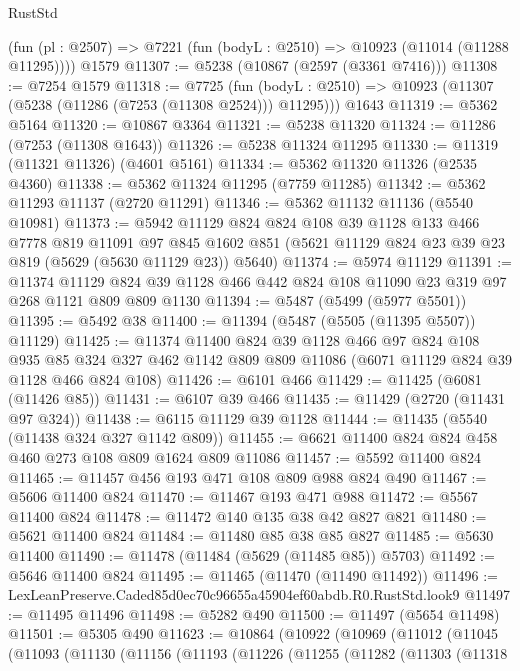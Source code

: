 \begin{lexlean}{RustStd}
\begin{coremodule}
    (fun (pl : @2507) => @7221 (fun (bodyL : @2510) => @10923 (@11014 (@11288 @11295))))
    @1579
@11307 := @5238 (@10867 (@2597 (@3361 @7416)))
@11308 := @7254 @1579
@11318 := @7725
    (fun (bodyL : @2510) => @10923 (@11307 (@5238 (@11286 (@7253 (@11308 @2524))) @11295)))
    @1643
@11319 := @5362 @5164
@11320 := @10867 @3364
@11321 := @5238 @11320
@11324 := @11286 (@7253 (@11308 @1643))
@11326 := @5238 @11324 @11295
@11330 := @11319 (@11321 @11326) (@4601 @5161)
@11334 := @5362 @11320 @11326 (@2535 @4360)
@11338 := @5362 @11324 @11295 (@7759 @11285)
@11342 := @5362 @11293 @11137 (@2720 @11291)
@11346 := @5362 @11132 @11136 (@5540 @10981)
@11373 := @5942
    @11129
    @824
    @824
    @108
    @39
    @1128
    @133
    @466
    @7778
    @819
    @11091
    @97
    @845
    @1602
    @851
    (@5621 @11129 @824 @23 @39 @23 @819 (@5629 (@5630 @11129 @23)) @5640)
@11374 := @5974 @11129
@11391 := @11374
    @11129
    @824
    @39
    @1128
    @466
    @442
    @824
    @108
    @11090
    @23
    @319
    @97
    @268
    @1121
    @809
    @809
    @1130
@11394 := @5487 (@5499 (@5977 @5501))
@11395 := @5492 @38
@11400 := @11394 (@5487 (@5505 (@11395 @5507)) @11129)
@11425 := @11374
    @11400
    @824
    @39
    @1128
    @466
    @97
    @824
    @108
    @935
    @85
    @324
    @327
    @462
    @1142
    @809
    @809
    @11086
    (@6071 @11129 @824 @39 @1128 @466 @824 @108)
@11426 := @6101 @466
@11429 := @11425 (@6081 (@11426 @85))
@11431 := @6107 @39 @466
@11435 := @11429 (@2720 (@11431 @97 @324))
@11438 := @6115 @11129 @39 @1128
@11444 := @11435 (@5540 (@11438 @324 @327 @1142 @809))
@11455 := @6621 @11400 @824 @824 @458 @460 @273 @108 @809 @1624 @809 @11086
@11457 := @5592 @11400 @824
@11465 := @11457 @456 @193 @471 @108 @809 @988 @824 @490
@11467 := @5606 @11400 @824
@11470 := @11467 @193 @471 @988
@11472 := @5567 @11400 @824
@11478 := @11472 @140 @135 @38 @42 @827 @821
@11480 := @5621 @11400 @824
@11484 := @11480 @85 @38 @85 @827
@11485 := @5630 @11400
@11490 := @11478 (@11484 (@5629 (@11485 @85)) @5703)
@11492 := @5646 @11400 @824
@11495 := @11465 (@11470 (@11490 @11492))
@11496 := LexLeanPreserve.Caded85d0ec70c96655a45904ef60abdb.R0.RustStd.look9
@11497 := @11495 @11496
@11498 := @5282 @490
@11500 := @11497 (@5654 @11498)
@11501 := @5305 @490
@11623 := @10864
    (@10922
      (@10969
        (@11012
          (@11045
            (@11093
              (@11130
                (@11156
                  (@11193
                    (@11226
                      (@11255
                        (@11282
                          (@11303
                            (@11318

\end{coremodule}
\end{lexlean}
